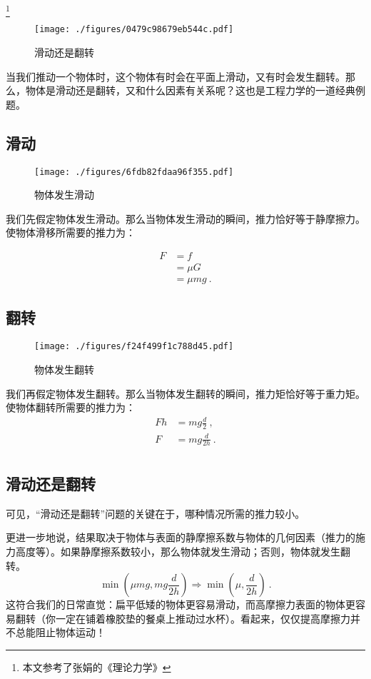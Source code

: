 
\begin{issues}
\issueMissDepend
\end{issues}

\footnote{本文参考了张娟的《理论力学》}

\begin{figure}[ht]
\centering
\texttt{[image: ./figures/0479c98679eb544c.pdf]}
\caption{滑动还是翻转} \label{fig_SDOTN_1}
\end{figure}

当我们推动一个物体时，这个物体有时会在平面上滑动，又有时会发生翻转。那么，物体是滑动还是翻转，又和什么因素有关系呢？这也是工程力学的一道经典例题。

\subsection{滑动}
\begin{figure}[ht]
\centering
\texttt{[image: ./figures/6fdb82fdaa96f355.pdf]}
\caption{物体发生滑动} \label{fig_SDOTN_2}
\end{figure}
我们先假定物体发生滑动。那么当物体发生滑动的瞬间，推力恰好等于静摩擦力。使物体滑移所需要的推力为：

\begin{equation}
\begin{aligned}
F&=f\\
&=\mu G\\
&=\mu mg~.
\end{aligned}
\end{equation}

\subsection{翻转}
\begin{figure}[ht]
\centering
\texttt{[image: ./figures/f24f499f1c788d45.pdf]}
\caption{物体发生翻转} \label{fig_SDOTN_3}
\end{figure}
我们再假定物体发生翻转。那么当物体发生翻转的瞬间，推力矩恰好等于重力矩。使物体翻转所需要的推力为：
\begin{equation}
\begin{aligned}
Fh&=mg \frac{d}{2}~,\\
F&=mg \frac{d}{2h}~.\\
\end{aligned}
\end{equation}

\subsection{滑动还是翻转}
可见，“滑动还是翻转”问题的关键在于，哪种情况所需的推力较小。

更进一步地说，结果取决于物体与表面的静摩擦系数与物体的几何因素（推力的施力高度等）。如果静摩擦系数较小，那么物体就发生滑动；否则，物体就发生翻转。
\begin{equation}
\min(\mu mg, mg \frac{d}{2h})\Rightarrow
\min(\mu, \frac{d}{2h})~.
\end{equation}
这符合我们的日常直觉：扁平低矮的物体更容易滑动，而高摩擦力表面的物体更容易翻转（你一定在铺着橡胶垫的餐桌上推动过水杯）。看起来，仅仅提高摩擦力并不总能阻止物体运动！
